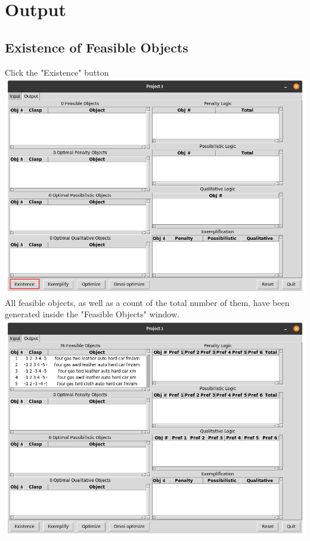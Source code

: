 \documentclass[titlepage]{article}
\begin{document}
\newpage

\section{Output}
\subsection{Existence of Feasible Objects} Click the "Existence" button\\
\includegraphics[scale=0.3]{existence}\\
All feasible objects, as well as a count of the total number of them, have been generated inside the "Feasible Objects" window.\\
\includegraphics[scale=0.3]{post_existence}
\newpage
\end{document}
